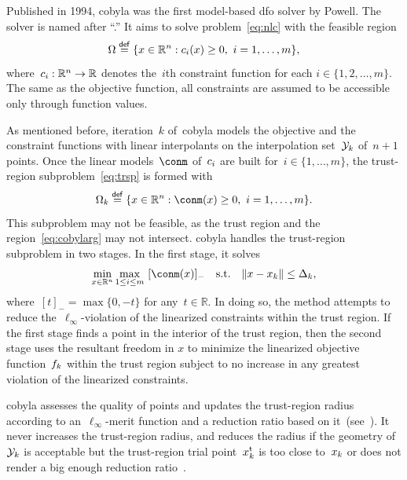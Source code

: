 \documentclass[
    smallextended,  %
    final,          %
]{svjour3}
\newcommand{\R}{\mathbb{R}}
\newcommand{\con}[1][i]{c\ifthenelse{\equal{#1}{}}{}{_{#1}}}
\newcommand{\eqdef}{\mathrel{\stackrel{\mathsf{def}}{=}}}
\newcommand{\fsetm}[1][k]{\Omega_{#1}}
\newcommand{\fset}{\Omega}
\newcommand{\iter}[1][k]{x\ifthenelse{\equal{#1}{}}{}{_{#1}}}
\newcommand{\norm}[2][]{#1\lVert#2#1\rVert}
\newcommand{\objm}[1][k]{\obj\ifthenelse{\equal{#1}{}}{}{_{#1}}}
\newcommand{\obj}{f}
\newcommand{\rad}[1][k]{\Delta\ifthenelse{\equal{#1}{}}{}{_{#1}}}
\newcommand{\set}[2][]{#1\{#2#1\}}
\newcommand{\st}{\text{s.t.}}
\newcommand{\trust}{{\text{t}}}
\newcommand{\xpt}[1][k]{\mathcal{Y}\ifthenelse{\equal{#1}{}}{}{_{#1}}}
\begin{document}
Published in 1994, \gls{cobyla} was the first model-based \gls{dfo} solver by Powell.
The solver is named after ``.''
It aims to solve problem~\eqref{eq:nlc} with the feasible region
\begin{equation*}
    \fset \eqdef \set{x \in \R^n : \con(x) \ge 0, ~ i = 1, \dots, m},
\end{equation*}
where~$\con : \R^n \to \R$ denotes the~$i$th constraint function for each $i \in \set{1, 2, \dots, m}$.
The same as the objective function, all constraints are assumed to be accessible only through function values.

As mentioned before, iteration~$k$ of~\gls{cobyla} models the objective and the constraint functions with {linear}
interpolants on the interpolation set~$\xpt$ of~$n + 1$ points.
Once the linear models~$\conm$ of~$\con$ are built for~$i \in \set{1, \dots, m}$,
the trust-region subproblem~\eqref{eq:trsp} is formed with
\begin{equation}
    \label{eq:cobylarg}
    \fsetm \eqdef \set{x \in \R^n : \conm(x) \ge 0, ~ i=1, \dots, m}.
\end{equation}
This subproblem may not be feasible, as the trust region and the region~\eqref{eq:cobylarg} may not intersect.
\gls{cobyla} handles the trust-region subproblem in two stages. In the first stage, it solves
\begin{equation*}
    \min_{x \in \R^n}  \max_{1 \le i \le m} ~ [\conm(x)]_{-} \quad \st \quad \norm{x - \iter} \le
    \rad,
\end{equation*}
where~$[t]_{-} = \max \set{0, -t}$ for any~$t\in \R$.
In doing so, the method attempts to reduce the~$\ell_{\infty}$-violation of the linearized constraints within the trust region.
If the first stage finds a point in the interior of the trust region,
then the second stage uses the resultant freedom in $x$ to minimize the linearized objective
function~$\objm$ within the trust region subject to no increase in any greatest violation of the
linearized constraints.

\gls{cobyla} assesses the quality of points and updates the trust-region radius according to
an~$\ell_\infty$-merit function and a reduction ratio based on it~(see~\cite[equations~(5),~(9), and~(10)]{Powell_1994}). It never increases
the trust-region radius, and reduces the radius if the geometry of~$\xpt$ is acceptable
but the trust-region trial point~$\iter^\trust$ is too close to~$\iter$ or does not render a big
enough reduction ratio~\mbox{\cite[equation~(11)]{Powell_1994}}.%
\end{document}
